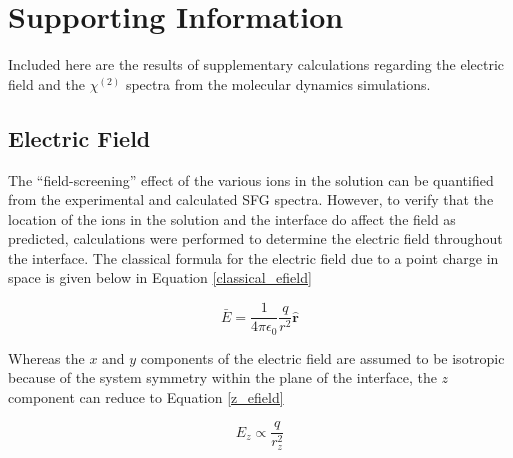 \documentclass[12pt]{article}
\begin{document}

\newcommand{\ang}{\,$\textrm{\AA}$}
\newcommand{\angs}{\ang}
\newcommand{\wat}{H$_2$O}
\newcommand{\ctc}{CCl$_4$}
\newcommand{\ctcwat}{CCl$_4$-H$_2$O}
\newcommand{\airwat}{air-H$_2$O}
\newcommand{\cl}{Cl$^-$}
\newcommand{\nit}{${\text{NO}_3}^-$}
\newcommand{\sul}{${\text{SO}_4}^{2-}$}
\newcommand{\nacl}{NaCl}
\newcommand{\sodnit}{NaNO$_3$}
\newcommand{\sodsul}{Na$_2$SO$_4$}
\newcommand{\costheta}{$\cos\theta$~}
\newcommand{\cosphi}{$\cos\phi$~}
\newcommand{\costhetarange}{~$<\cos\theta<$~}
\newcommand{\cosphirange}{~$<\cos\phi<$~}
\newcommand{\cm}{\,$cm^{-1}$}

\doublespacing

\section {Supporting Information}

Included here are the results of supplementary calculations regarding the electric field and the $\chi^{(2)}$ spectra from the molecular dynamics simulations.

\subsection {Electric Field}

The ``field-screening'' effect of the various ions in the solution can be quantified from the experimental and calculated SFG spectra. However, to verify that the location of the ions in the solution and the interface do affect the field as predicted, calculations were performed to determine the electric field throughout the interface. The classical formula for the electric field due to a point charge in space is given below in Equation \ref{classical_efield}

\begin{equation}\label{classical_efield}
	\bar{E}=\frac{1}{4\pi\epsilon_0}\frac{q}{r^2}\hat{\mathbf{r}}
\end{equation}

Whereas the $x$ and $y$ components of the electric field are assumed to be isotropic because of the system symmetry within the plane of the interface, the $z$ component can reduce to Equation \ref{z_efield}

\begin{equation}\label{z_efield}
	E_z \propto \frac{q}{r_z^2}
\end{equation}
\end{document}
